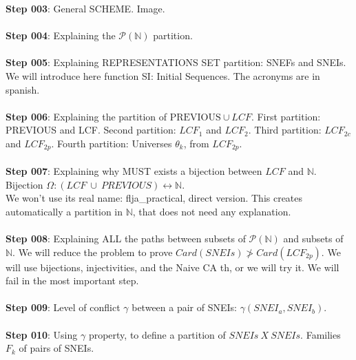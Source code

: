 		\noindent
		\textbf{Step 003}: General SCHEME. Image.
		\\\\
		
		\noindent
		\textbf{Step 004}: Explaining the $\mathcal{P}(\mathbb{N})$ partition.
		\\\\
	
		\noindent
		\textbf{Step 005}: Explaining REPRESENTATIONS SET partition: SNEFs and SNEIs. We will introduce here function SI: Initial Sequences. The acronyms are in spanish.
		\\\\
		
		\noindent
		\textbf{Step 006}: Explaining the partition of $\text{PREVIOUS} \cup LCF$. First partition: PREVIOUS and LCF. Second partition: $LCF_{1}$ and $LCF_{2}$. Third partition: $LCF_{2c}$ and $LCF_{2p}$. Fourth partition: Universes $\theta_{k}$, from $LCF_{2p}$.
		\\\\
		
		\noindent
		\textbf{Step 007}: Explaining why MUST exists a bijection between $LCF$ and $\mathbb{N}$.\\
		Bijection $\Omega: (LCF \: \cup \: PREVIOUS) \leftrightarrow \mathbb{N}$.\\
		We won't use its real name: flja\_practical, direct version. This creates automatically a partition in $\mathbb{N}$, that does not need any explanation.
		\\\\
		
		\noindent
		\textbf{Step 008}: Explaining ALL the paths between subsets of $\mathcal{P}(\mathbb{N})$ and subsets of $\mathbb{N}$. We will reduce the problem to prove $ Card(SNEIs) \ngtr Card(LCF_{2p})$. We will use bijections, injectivities, and the Naive CA th, or we will try it. We will fail in the most important step. %
		\\\\
		
		\noindent
		\textbf{Step 009}: Level of conflict $\gamma$ between a pair of SNEIs: $\gamma(SNEI_{a}, SNEI_{b})$.
		\\\\
		
		\noindent
		\textbf{Step 010}: Using $\gamma$ property, to define a partition of $  SNEIs \: X \: SNEIs $. Families $F_{k}$ of pairs of SNEIs.
		\\\\
		
